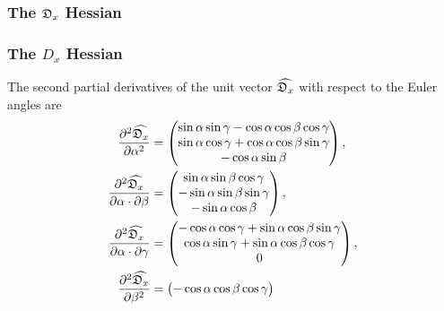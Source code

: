 \begin{latexonly}
    \subsubsection{The $\mathfrak{D}_x$ Hessian}
\end{latexonly}
\begin{htmlonly}
    \subsubsection{The $D_x$ Hessian}
\end{htmlonly}

The second partial derivatives of the unit vector $\widehat{\mathfrak{D}_x}$ with respect to the Euler angles are
\begin{subequations}
\begin{align}
    \frac{\partial^2 \widehat{\mathfrak{D}_x}}{\partial \alpha^2} &= \begin{pmatrix}
        \sin \alpha \sin \gamma - \cos \alpha \cos \beta \cos \gamma \\
        \sin \alpha \cos \gamma + \cos \alpha \cos \beta \sin \gamma \\
        -\cos \alpha \sin \beta \\
    \end{pmatrix}, \\
    \frac{\partial^2 \widehat{\mathfrak{D}_x}}{\partial \alpha \cdot \partial \beta} &= \begin{pmatrix}
        \sin \alpha \sin \beta \cos \gamma \\
        - \sin \alpha \sin \beta \sin \gamma \\
        -\sin \alpha \cos \beta \\
    \end{pmatrix}, \\
    \frac{\partial^2 \widehat{\mathfrak{D}_x}}{\partial \alpha \cdot \partial \gamma} &= \begin{pmatrix}
        -\cos \alpha \cos \gamma + \sin \alpha \cos \beta \sin \gamma \\
        \cos \alpha \sin \gamma + \sin \alpha \cos \beta \cos \gamma \\
        0 \\
    \end{pmatrix}, \\
    \frac{\partial^2 \widehat{\mathfrak{D}_x}}{\partial \beta^2} &= \begin{pmatrix}
        -\cos \alpha \cos \beta \cos \gamma \\

\end{pmatrix}
\end{align}
\end{subequations}
